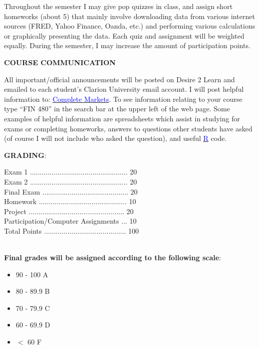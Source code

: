 \documentclass{article}
\begin{document}
Throughout the semester I may give pop quizzes in class, and assign short homeworks (about 5) that mainly involve downloading data from various internet sources (FRED, Yahoo Finance, Oanda, etc.) and performing various calculations or graphically presenting the data.  Each quiz and assignment will be weighted equally. During the semester, I may increase the amount of participation points.
\\
\begin{center}
{\bf COURSE COMMUNICATION}
\end{center}  
All important/official announcements will be posted on Desire 2 Learn and emailed to each student's Clarion University email account.  I will post helpful information to: \href{http://www.complete-markets.com}{\textcolor{blue}{Complete Markets}}.  To see information relating to your course type ``FIN 480'' in the search bar at the upper left of the web page.  Some examples of helpful information are spreadsheets which assist in studying for exams or completing homeworks, answers to questions other students have asked (of course I will not include who asked the question), and useful \href{http://www.r-project.org}{\textcolor{blue}{R}} code.
\\
\begin{center}
{\bf GRADING}:\\
\end{center}
Exam 1 ..................................................   20\\
Exam 2 ..................................................   20\\
Final Exam ............................................  20\\
Homework .............................................   10\\
Project .................................................    20\\
Participation/Computer Assignments ...  10\\
Total Points ..........................................  100\\
\\
\begin{center}
{\bf Final grades will be assigned according to the following scale}:
\end{center}
\begin{itemize}
\item 90 - 100 A
\item 80 - 89.9 B
\item 70 - 79.9 C
\item 60 - 69.9 D
\item $<$ 60 F
\end{itemize}
\end{document}
